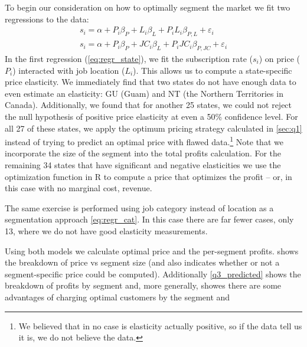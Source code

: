 \section{} %
To begin our consideration on how to optimally segment the market we fit two regressions to the data:
\begin{align}
s_i = \alpha +  P_i \beta_P + L_i \beta_L + P_i L_i \beta_{P,L} + \varepsilon_i \label{eq:regr_state} \\
s_i = \alpha +  P_i \beta_P + JC_i \beta_L + P_i JC_i \beta_{P,JC} + \varepsilon_i \label{eq:regr_cat}
\end{align}
In the first regression (\vref{eq:regr_state}), we fit the subscription rate ($s_i$) on price ($P_i$) interacted with job location ($L_i$). This allows us to compute a state-specific price elasticity. We immediately find that two states do not have enough data to even estimate an elasticity: GU (Guam) and NT (the Northern Territories in Canada).  Additionally, we found that for another 25 states, we could not reject the null hypothesis of positive price elasticity at even a 50\% confidence level. For all 27 of these states, we apply the optimum pricing strategy calculated in \cref{sec:q1} instead of trying to predict an optimal price with flawed data.\footnote{We believed that in no case is elasticity actually positive, so if the data tell us it is, we do not believe the data.} Note that we incorporate the size of the segment into the total profits calculation.  For the remaining 34 states that have significant and negative elasticities we use the optimization function in R to compute a price that optimizes the profit -- or, in this case with no marginal cost, revenue.

The same exercise is performed using job category instead of location as a segmentation approach \vref{eq:regr_cat}.  In this case there are far fewer cases, only 13, where we do not have good elasticity measurements.

Using both models we calculate optimal price and the per-segment profits.   shows the breakdown of price vs segment size (and also indicates whether or not a segment-specific price could be computed).  Additionally \vref{q3_predicted} shows the breakdown of profits by segment and, more generally, showes there are some advantages of charging 
optimal customers by the segment and



